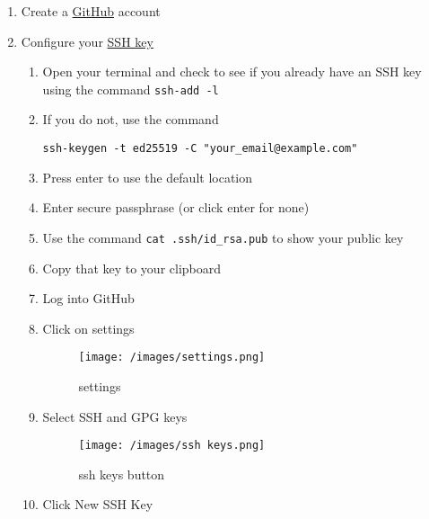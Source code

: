 \documentclass[
  letterpaper,
  DIV=11,
  numbers=noendperiod]{scrartcl}
\providecommand{\tightlist}{%
  \setlength{\itemsep}{0pt}\setlength{\parskip}{0pt}}\usepackage{longtable,booktabs,array}
\begin{document}
\begin{enumerate}
\def\labelenumi{\arabic{enumi}.}
\tightlist
\item
  Create a \href{https://github.com/}{GitHub} account
\item
  Configure your
  \href{https://docs.github.com/en/authentication/connecting-to-github-with-ssh/adding-a-new-ssh-key-to-your-github-account}{SSH
  key}

  \begin{enumerate}
  \def\labelenumii{\arabic{enumii}.}
  \item
    Open your terminal and check to see if you already have an SSH key
    using the command \texttt{ssh-add\ -l}
  \item
    If you do not, use the command

\begin{verbatim}
ssh-keygen -t ed25519 -C "your_email@example.com"
\end{verbatim}
  \item
    Press enter to use the default location
  \item
    Enter secure passphrase (or click enter for none)
  \item
    Use the command \texttt{cat\ .ssh/id\_rsa.pub} to show your public
    key
  \item
    Copy that key to your clipboard
  \item
    Log into GitHub
  \item
    Click on settings

    \begin{figure}

    {\centering \texttt{[image: /images/settings.png]}

    }

    \caption{settings}

    \end{figure}
  \item
    Select SSH and GPG keys

    \begin{figure}

    {\centering \texttt{[image: /images/ssh keys.png]}

    }

    \caption{ssh keys button}

    \end{figure}
  \item
    Click New SSH Key


\end{enumerate}
\end{enumerate}
\end{document}
